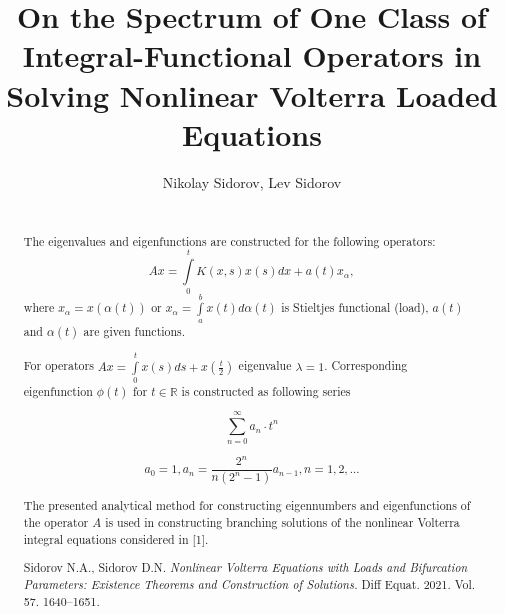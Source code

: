 \begin{englishtitle}
\title{On the Spectrum of One Class of Integral-Functional Operators in Solving  Nonlinear Volterra  Loaded Equations}
\author{Nikolay Sidorov, 
             Lev Sidorov}

\maketitle

\begin{abstract}
	


~\\

The eigenvalues and eigenfunctions are constructed for the following operators:
$$ Ax = \int\limits_0^t K(x,s) x(s)dx + a(t)x_{\alpha},$$
where  $x_{\alpha} = x ( \alpha (t))$  or  $x_{\alpha} = \int\limits_a^bx(t)d\alpha(t)$  is Stieltjes functional  (load), $a(t)$ and  $\alpha(t)$ 
are given functions.



\begin{example}
	For operators $Ax = \int\limits_0^t x(s)ds + x\left(\displaystyle\frac{t}{2}\right)$  eigenvalue $\lambda = 1$.  Corresponding eigenfunction  $\phi(t)$  for  $ t \in \mathbb{R}$  is constructed as following series
	
	$$\sum_{n=0}^{\infty} a_n\cdot t^n$$
	
	$$a_{0} = 1, a_{n} = \frac{2^{n}}{n(2^{n}-1)}a_{n-1}, n = 1, 2, ...$$
\end{example}


The presented analytical method for constructing eigennumbers and eigenfunctions of the operator $A$ is used in constructing branching solutions of the nonlinear Volterra integral equations considered in [1].

\begin{thebibliography}{99}
	Sidorov N.A., Sidorov D.N.  {\it Nonlinear Volterra Equations with Loads and Bifurcation Parameters: Existence Theorems and Construction of Solutions.} Diff Equat. 2021.  Vol. 57. 1640--1651.
	
\end{thebibliography}

\end{abstract}
\end{englishtitle}

